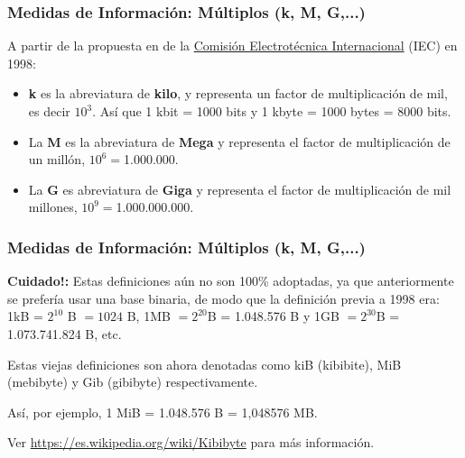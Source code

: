 \documentclass[aspectratio=169]{beamer}
\begin{document}
\begin{frame}[fragile]\frametitle{Medidas de Información: Múltiplos (k, M, G,...)}
A partir de la propuesta en de la \href{https://es.wikipedia.org/wiki/Comisi%C3%B3n_Electrot%C3%A9cnica_Internacional}{Comisión Electrotécnica Internacional} (IEC) en 1998:
\begin{itemize}
	\item \textbf{k} es la abreviatura de \textbf{kilo}, y representa un factor de multiplicación de mil, es decir $10^3$. Así que 1 kbit = 1000 bits y 1 kbyte = 1000 bytes = 8000 bits. 
	
	\item La \textbf{M} es la abreviatura de \textbf{Mega} y representa el factor de multiplicación de un millón, $10^{6}= $1.000.000.
	
	\item La \textbf{G} es abreviatura de \textbf{Giga} y representa el factor de multiplicación de mil millones, $10^{9} = $1.000.000.000.
\end{itemize}
\end{frame}


\begin{frame}[fragile]\frametitle{Medidas de Información: Múltiplos (k, M, G,...)}

\begin{block}{}
\textbf{Cuidado!:} Estas definiciones aún no son 100\% adoptadas, ya que anteriormente se prefería usar una base binaria, de modo que la definición previa a 1998 era: 1kB = $2^{10}$ B $=1024$ B, 1MB $=2^{20}$B = 1.048.576 B y 1GB $=2^{30}$B = 1.073.741.824 B, etc. 
\end{block}

\begin{block}{}
Estas viejas definiciones son ahora denotadas como kiB (kibibite), MiB (mebibyte) y  Gib (gibibyte) respectivamente. 
\end{block}
\begin{block}{}
Así, por ejemplo, 1 MiB = 1.048.576 B = 1,048576 MB.
\end{block}
Ver \url{https://es.wikipedia.org/wiki/Kibibyte} para más información.
\end{frame}
\end{document}
